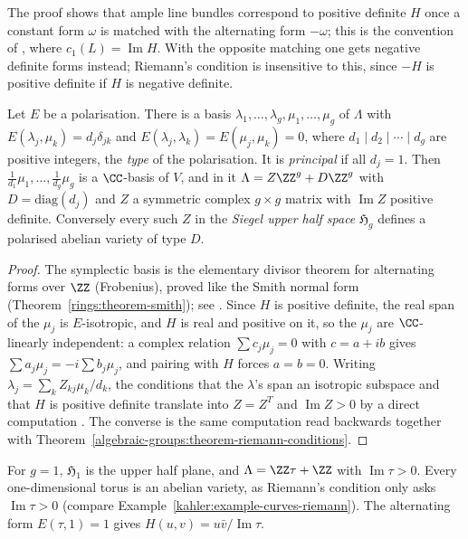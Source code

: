 \begin{remark}\label{algebraic-groups:remark-sign-convention}
The proof shows that ample line bundles correspond to positive definite $H$ once a constant form $\omega$ is matched with the alternating form $-\omega$; this is the convention of
\cite{birkenhake-lange}, where $c_1(L) = \operatorname{Im}H$. With the opposite matching one gets negative definite forms instead; Riemann's condition is insensitive to this, since
$-H$ is positive definite if $H$ is negative definite.
\end{remark}

\begin{proposition}\label{algebraic-groups:proposition-period-matrix}
Let $E$ be a polarisation. There is a basis $\lambda_1, \ldots, \lambda_g, \mu_1, \ldots, \mu_g$ of $\Lambda$ with
$E(\lambda_j, \mu_k) = d_j\delta_{jk}$ and $E(\lambda_j, \lambda_k) = E(\mu_j, \mu_k) = 0$, where $d_1 \mid d_2 \mid \cdots \mid d_g$ are positive integers, the \emph{type} of the polarisation.
It is \emph{principal} if all $d_j = 1$. Then $\frac{1}{d_1}\mu_1, \ldots, \frac{1}{d_g}\mu_g$ is a $\CC$-basis of $V$, and in it $\Lambda = Z\ZZ^g + D\ZZ^g$ with $D = \mathrm{diag}(d_j)$
and $Z$ a symmetric complex $g \times g$ matrix with $\operatorname{Im}Z$ positive definite. Conversely every such $Z$ in the \emph{Siegel upper half space} $\mathfrak{H}_g$ defines a
polarised abelian variety of type $D$.
\end{proposition}

\begin{proof}
The symplectic basis is the elementary divisor theorem for alternating forms over $\ZZ$ (Frobenius), proved like the Smith normal form (Theorem~\ref{rings:theorem-smith}); see
\cite{birkenhake-lange}. Since $H$ is positive definite, the real span of the $\mu_j$ is $E$-isotropic, and $H$ is real and positive on it, so the $\mu_j$ are $\CC$-linearly
independent: a complex relation $\sum c_j\mu_j = 0$ with $c = a + ib$ gives $\sum a_j\mu_j = -i\sum b_j\mu_j$, and pairing with $H$ forces $a = b = 0$. Writing
$\lambda_j = \sum_kZ_{kj}\mu_k/d_k$, the conditions that the $\lambda$'s span an isotropic subspace and that $H$ is positive definite translate into $Z = Z^T$ and
$\operatorname{Im}Z > 0$ by a direct computation \cite{birkenhake-lange}. The converse is the same computation read backwards together with
Theorem~\ref{algebraic-groups:theorem-riemann-conditions}.
\end{proof}

\begin{example}\label{algebraic-groups:example-dimension-one}
For $g = 1$, $\mathfrak{H}_1$ is the upper half plane, and $\Lambda = \ZZ\tau + \ZZ$ with $\operatorname{Im}\tau > 0$. Every one-dimensional torus is an abelian variety, as Riemann's
condition only asks $\operatorname{Im}\tau > 0$ (compare Example~\ref{kahler:example-curves-riemann}). The alternating form $E(\tau, 1) = 1$ gives
$H(u, v) = u\bar v/\operatorname{Im}\tau$.
\end{example}

